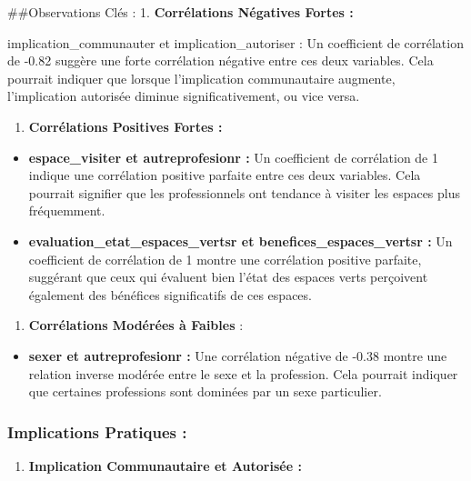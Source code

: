 \documentclass[
]{article}
\providecommand{\tightlist}{%
  \setlength{\itemsep}{0pt}\setlength{\parskip}{0pt}}
\begin{document}
\#\#Observations Clés : 1. \textbf{Corrélations Négatives Fortes :}

implication\_communauter et implication\_autoriser : Un coefficient de
corrélation de -0.82 suggère une forte corrélation négative entre ces
deux variables. Cela pourrait indiquer que lorsque l'implication
communautaire augmente, l'implication autorisée diminue
significativement, ou vice versa.

\begin{enumerate}
\def\labelenumi{\arabic{enumi}.}
\setcounter{enumi}{1}
\tightlist
\item
  \textbf{Corrélations Positives Fortes :}
\end{enumerate}

\begin{itemize}
\item
  \textbf{espace\_visiter et autreprofesionr :} Un coefficient de
  corrélation de 1 indique une corrélation positive parfaite entre ces
  deux variables. Cela pourrait signifier que les professionnels ont
  tendance à visiter les espaces plus fréquemment.
\item
  \textbf{evaluation\_etat\_espaces\_vertsr et
  benefices\_espaces\_vertsr :} Un coefficient de corrélation de 1
  montre une corrélation positive parfaite, suggérant que ceux qui
  évaluent bien l'état des espaces verts perçoivent également des
  bénéfices significatifs de ces espaces.
\end{itemize}

\begin{enumerate}
\def\labelenumi{\arabic{enumi}.}
\setcounter{enumi}{2}
\tightlist
\item
  \textbf{Corrélations Modérées à Faibles} :
\end{enumerate}

\begin{itemize}
\tightlist
\item
  \textbf{sexer et autreprofesionr :} Une corrélation négative de -0.38
  montre une relation inverse modérée entre le sexe et la profession.
  Cela pourrait indiquer que certaines professions sont dominées par un
  sexe particulier.
\end{itemize}

\subsubsection{Implications Pratiques :}\label{implications-pratiques}

\begin{enumerate}
\def\labelenumi{\arabic{enumi}.}
\tightlist
\item
  \textbf{Implication Communautaire et Autorisée :}
\end{enumerate}
\end{document}
